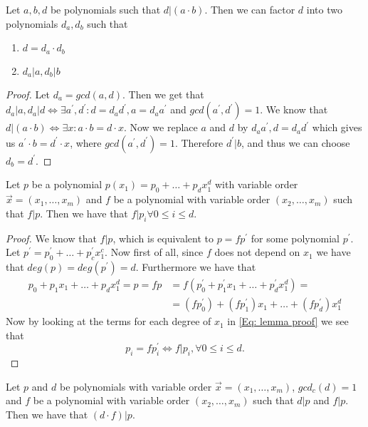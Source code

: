 \begin{lemma}\label{Lemma0}
  Let $a,b,d$ be polynomials such that $d|(a\cdot b)$. Then we can factor $d$ into two polynomials $d_a,d_b$ such that
  \begin{enumerate}
    \item $d = d_a\cdot d_b$
    \item $d_a|a, d_b|b$
  \end{enumerate}
\end{lemma}
\begin{proof}
  Let $d_a = gcd(a,d)$. Then we get that $d_a|a, d_a|d \iff \exists a^\prime,d^\prime: d=d_ad^\prime, a=d_aa^\prime$ and $gcd(a^\prime,d^\prime)=1$. We know that $d|(a\cdot b) \iff \exists x: a\cdot b=d\cdot x$. Now we replace $a$ and $d$ by $d_aa^\prime, d=d_ad^\prime$ which gives us $a^\prime\cdot b=d^\prime \cdot x$, where $gcd(a^\prime,d^\prime)=1$. Therefore $d^\prime|b$, and thus we can choose $d_b=d^\prime$.
\end{proof}
\begin{lemma}\label{Lemma1}
  Let $p$ be a polynomial $p(x_1)=p_0+\ldots+p_dx_1^d$ with variable order $\vec{x}=(x_1,\ldots,x_m)$ and $f$ be a polynomial with variable order $(x_2,\ldots,x_m)$ such that $f|p$. Then we have that $f|p_i\forall 0\leq i\leq d$.
\end{lemma}
\begin{proof}
  We know that $f|p$, which is equivalent to $p=fp^\prime$ for some polynomial $p^\prime$. Let $p^\prime=p_0^\prime+\ldots+p_c^\prime x_1^c$. Now first of all, since $f$ does not depend on $x_1$ we have that $deg(p)=deg(p^\prime)=d$. Furthermore we have that
  \begin{equation}\label{Eq: lemma proof}
    \begin{split}
      p_0+p_1x_1+\ldots+p_dx_1^d=p=fp &=f(p_0^\prime+p_1^\prime x_1+\ldots+p_d^\prime x_1^d)= \\
      &=(fp_0^\prime)+(fp_1^\prime)x_1+\ldots+(fp_d^\prime)x_1^d
    \end{split}
  \end{equation}
  Now by looking at the terms for each degree of $x_1$ in \ref{Eq: lemma proof} we see that
  \begin{equation}
    p_i=fp_i^\prime \iff f|p_i, \forall 0\leq i\leq d.
  \end{equation}
\end{proof}
\begin{lemma}\label{Lemma2}
  Let $p$ and $d$ be polynomials with variable order $\vec{x}=(x_1,\ldots,x_m)$, $gcd_c(d)=1$ and $f$ be a polynomial with variable order $(x_2,\ldots,x_m)$ such that $d|p$ and $f|p$. Then we have that $(d\cdot f)|p$.
\end{lemma}
